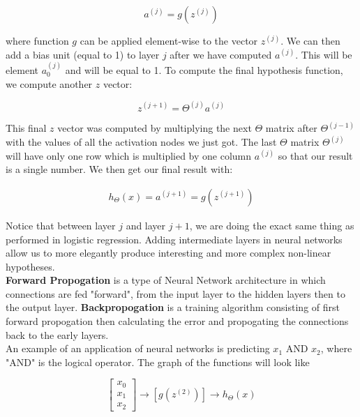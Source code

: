     \begin{equation*}
        a^{(j)} = g\left(z^{(j)}\right)
    \end{equation*}

    \noindent where function $g$ can be applied element-wise to the vector $z^{(j)}$. We can then add a
    bias unit (equal to 1) to layer $j$ after we have computed $a^{(j)}$. This will be element $a_0^{(j)}$
    and will be equal to 1. To compute the final hypothesis function, we compute another $z$ vector:

    \begin{equation*}
        z^{(j+1)} = \Theta^{(j)} a^{(j)}
    \end{equation*}

    \noindent This final $z$ vector was computed by multiplying the next $\Theta$ matrix after
    $\Theta^{(j-1)}$ with the values of all the activation nodes we just got. The last $\Theta$ matrix
    $\Theta^{(j)}$ will have only one row which is multiplied by one column $a^{(j)}$ so that our result
    is a single number. We then get our final result with:

    \begin{align*}
        h_{\Theta}(x) = a^{(j+1)} = g\left(z^{(j+1)}\right)
    \end{align*}

    \noindent Notice that between layer $j$ and layer $j+1$, we are doing the exact same thing as performed
    in logistic regression. Adding intermediate layers in neural networks allow us to more elegantly produce
    interesting and more complex non-linear hypotheses. \\

    \noindent \textbf{Forward Propogation} is a type of Neural Network architecture in which connections
    are fed "forward", from the input layer to the hidden layers then to the output layer.
    \textbf{Backpropogation} is a training algorithm consisting of first forward propogation then
    calculating the error and propogating the connections back to the early layers. \\

    \noindent An example of an application of neural networks is predicting $x_1$ AND $x_2$, where "AND"
    is the logical operator. The graph of the functions will look like

    \begin{equation*}
        \begin{bmatrix}
            x_0 \\ x_1 \\ x_2
        \end{bmatrix}
        \to
        \left[g(z^{(2)})\right]
        \to
        h_{\Theta}(x)
    \end{equation*}

